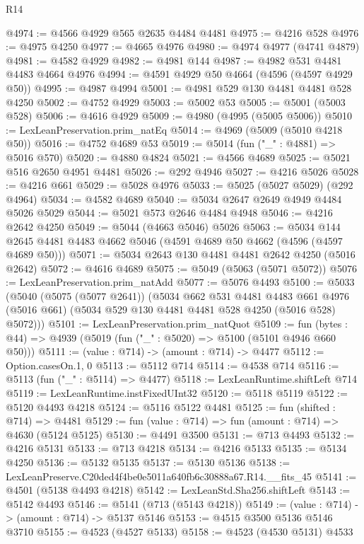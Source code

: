 \begin{lexlean}{R14}
\begin{coremodule}
@4974 := @4566 @4929 @565 @2635 @4484 @4481
@4975 := @4216 @528
@4976 := @4975 @4250
@4977 := @4665 @4976
@4980 := @4974 @4977 (@4741 @4879)
@4981 := @4582 @4929
@4982 := @4981 @144
@4987 := @4982 @531 @4481 @4483 @4664 @4976
@4994 := @4591 @4929 @50 @4664 (@4596 (@4597 @4929 @50))
@4995 := @4987 @4994
@5001 := @4981 @529 @130 @4481 @4481 @528 @4250
@5002 := @4752 @4929
@5003 := @5002 @53
@5005 := @5001 (@5003 @528)
@5006 := @4616 @4929
@5009 := @4980 (@4995 (@5005 @5006))
@5010 := LexLeanPreservation.prim_natEq
@5014 := @4969 (@5009 (@5010 @4218 @50))
@5016 := @4752 @4689 @53
@5019 := @5014 (fun ("_" : @4881) => @5016 @570)
@5020 := @4880 @4824
@5021 := @4566 @4689
@5025 := @5021 @516 @2650 @4951 @4481
@5026 := @292 @4946
@5027 := @4216 @5026
@5028 := @4216 @661
@5029 := @5028 @4976
@5033 := @5025 (@5027 @5029) (@292 @4964)
@5034 := @4582 @4689
@5040 := @5034 @2647 @2649 @4949 @4484 @5026 @5029
@5044 := @5021 @573 @2646 @4484 @4948
@5046 := @4216 @2642 @4250
@5049 := @5044 (@4663 @5046) @5026
@5063 := @5034 @144 @2645 @4481 @4483 @4662 @5046 (@4591 @4689 @50 @4662 (@4596 (@4597 @4689 @50)))
@5071 := @5034 @2643 @130 @4481 @4481 @2642 @4250 (@5016 @2642)
@5072 := @4616 @4689
@5075 := @5049 (@5063 (@5071 @5072))
@5076 := LexLeanPreservation.prim_natAdd
@5077 := @5076 @4493
@5100 := @5033
    (@5040
      (@5075 (@5077 @2641))
      (@5034
        @662
        @531
        @4481
        @4483
        @661
        @4976
        (@5016 @661)
        (@5034 @529 @130 @4481 @4481 @528 @4250 (@5016 @528) @5072)))
@5101 := LexLeanPreservation.prim_natQuot
@5109 := fun (bytes : @44) => @4939 (@5019 (fun ("_" : @5020) => @5100 (@5101 @4946 @660 @50)))
@5111 := (value : @714) -> (amount : @714) -> @4477
@5112 := Option.casesOn.{1, 0}
@5113 := @5112 @714
@5114 := @4538 @714
@5116 := @5113 (fun ("_" : @5114) => @4477)
@5118 := LexLeanRuntime.shiftLeft @714
@5119 := LexLeanRuntime.instFixedUInt32
@5120 := @5118 @5119
@5122 := @5120 @4493 @4218
@5124 := @5116 @5122 @4481
@5125 := fun (shifted : @714) => @4481
@5129 := fun (value : @714) => fun (amount : @714) => @4630 (@5124 @5125)
@5130 := @4491 @3500
@5131 := @713 @4493
@5132 := @4216 @5131
@5133 := @713 @4218
@5134 := @4216 @5133
@5135 := @5134 @4250
@5136 := @5132 @5135
@5137 := @5130 @5136
@5138 := LexLeanPreserve.C20ded4f4be0e5011a640fb6c30888a67.R14.__fits_45
@5141 := @4501 (@5138 @4493 @4218)
@5142 := LexLeanStd.Sha256.shiftLeft
@5143 := @5142 @4493
@5146 := @5141 (@713 (@5143 @4218))
@5149 := (value : @714) -> (amount : @714) -> @5137 @5146
@5153 := @4515 @3500 @5136 @5146 @3710
@5155 := @4523 (@4527 @5133)
@5158 := @4523 (@4530 @5131) @4533

\end{coremodule}
\end{lexlean}
